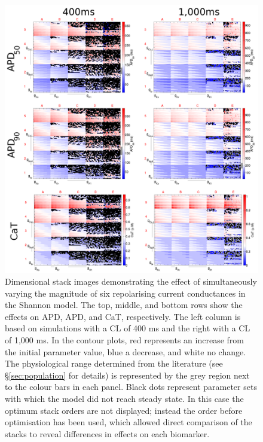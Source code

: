 \documentclass[../thesis-main.tex]{subfiles}
\begin{document}
\begin{figure}
 \centering
 \includegraphics[width=\textwidth]{shannon-paramEffect}
 \caption[Effect of parameter variation on Shannon population.]{Dimensional stack images demonstrating the effect of simultaneously varying the magnitude of six repolarising current conductances in the Shannon model. The top, middle, and bottom rows show the effects on APD, APD, and CaT, respectively. The left column is based on simulations with a CL of 400 ms and the right with a CL of 1,000 ms. In the contour plots, red represents an increase from the initial parameter value, blue a decrease, and white no change. The physiological range determined from the literature (see \S\ref{sec:population} for details) is represented by the grey region next to the colour bars in each panel. Black dots represent parameter sets with which the model did not reach steady state. In this case the optimum stack orders are not displayed; instead the order before optimisation has been used, which allowed direct comparison of the stacks to reveal differences in effects on each biomarker.}
 \label{fig:shannon-paramEffect}
\end{figure}
\end{document}
